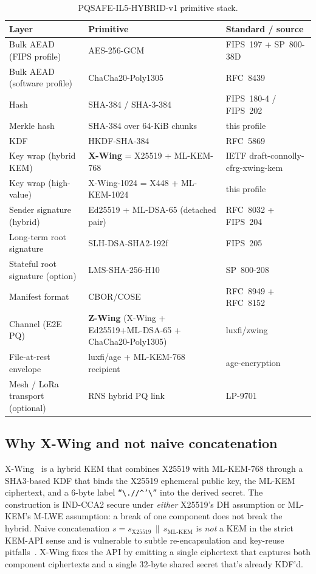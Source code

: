 \documentclass[11pt,a4paper]{article}
\begin{document}
\begin{table}[H]
\centering
\small
\begin{tabularx}{\linewidth}{l l X}
\toprule
\textbf{Layer} & \textbf{Primitive} & \textbf{Standard / source} \\
\midrule
Bulk AEAD (FIPS profile) & AES-256-GCM & FIPS~197 + SP~800-38D~\cite{fips197} \\
Bulk AEAD (software profile) & ChaCha20-Poly1305 & RFC~8439~\cite{rfc8439} \\
Hash & SHA-384 / SHA-3-384 & FIPS~180-4 / FIPS~202 \\
Merkle hash & SHA-384 over 64-KiB chunks & this profile \\
KDF & HKDF-SHA-384 & RFC~5869 \\
Key wrap (hybrid KEM) & \textbf{X-Wing} = X25519 + ML-KEM-768 & IETF draft-connolly-cfrg-xwing-kem~\cite{xwing2024} \\
Key wrap (high-value) & X-Wing-1024 = X448 + ML-KEM-1024 & this profile \\
Sender signature (hybrid) & Ed25519 + ML-DSA-65 (detached pair) & RFC~8032 + FIPS~204~\cite{fips204} \\
Long-term root signature & SLH-DSA-SHA2-192f & FIPS~205~\cite{fips205} \\
Stateful root signature (option) & LMS-SHA-256-H10 & SP~800-208~\cite{sp800208} \\
Manifest format & CBOR/COSE & RFC~8949 + RFC~8152~\cite{rfc8949,rfc8152} \\
Channel (E2E PQ) & \textbf{Z-Wing} (X-Wing + Ed25519+ML-DSA-65 + ChaCha20-Poly1305) & luxfi/zwing~\cite{luxzwing} \\
File-at-rest envelope & luxfi/age + ML-KEM-768 recipient & age-encryption~\cite{age,luxage} \\
Mesh / LoRa transport (optional) & RNS hybrid PQ link & LP-9701~\cite{lp9701} \\
\bottomrule
\end{tabularx}
\caption{PQSAFE-IL5-HYBRID-v1 primitive stack.}
\end{table}

\subsection{Why X-Wing and not naive concatenation}

X-Wing~\cite{xwing2024} is a hybrid KEM that combines X25519 with
ML-KEM-768 through a SHA3-based KDF that binds the X25519 ephemeral
public key, the ML-KEM ciphertext, and a 6-byte label
\texttt{``\textbackslash{}.//\^{}'\textbackslash{}''} into the derived
secret. The construction is IND-CCA2 secure under \emph{either}
X25519's DH assumption or ML-KEM's M-LWE assumption: a break of one
component does not break the hybrid. Naive concatenation
$s = s_\text{X25519}\,\|\,s_\text{ML-KEM}$ is \emph{not} a KEM in the
strict KEM-API sense and is vulnerable to subtle re-encapsulation and
key-reuse pitfalls~\cite{xwing2024}. X-Wing fixes the API by emitting
a single ciphertext that captures both component ciphertexts and a
single 32-byte shared secret that's already KDF'd.
\end{document}
